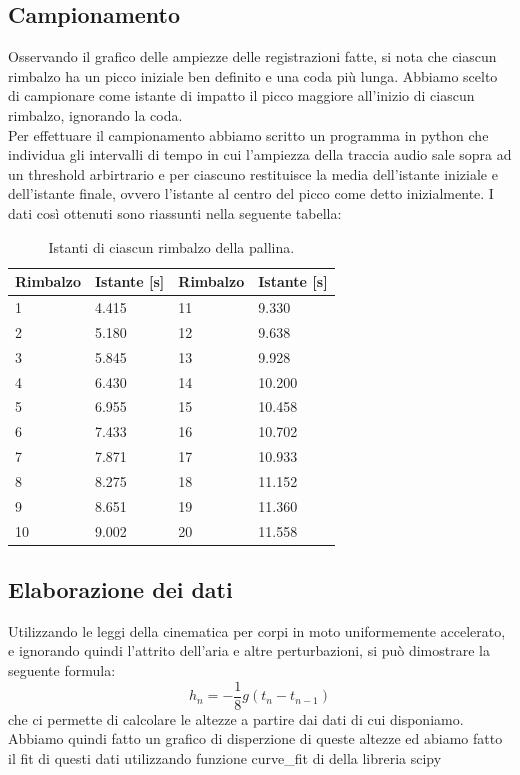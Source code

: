 \documentclass[a4paper]{article}
\begin{document}
    \subsection{Campionamento}
    Osservando il grafico delle ampiezze delle registrazioni fatte, si nota che ciascun rimbalzo
    ha un picco iniziale ben definito e una coda più lunga. 
    Abbiamo scelto di campionare come istante di impatto il picco maggiore all'inizio di ciascun rimbalzo,
    ignorando la coda.\\
    Per effettuare il campionamento abbiamo scritto un programma in python che individua
    gli intervalli di tempo in cui l'ampiezza della traccia audio sale sopra ad un threshold
    arbirtrario e per ciascuno restituisce la media dell'istante iniziale e dell'istante finale,
    ovvero l'istante al centro del picco come detto inizialmente.
    I dati così ottenuti sono riassunti nella seguente tabella:\\
    \begin{table}[H]
        \centering
        \begin{tabular}{ll|ll}
            Rimbalzo & Istante [\si{s}] & Rimbalzo & Istante [\si{s}]\\
            \hline
            \hline
            1&4.415&11&9.330\\
            2&5.180&12&9.638\\
            3&5.845&13&9.928\\
            4&6.430&14&10.200\\
            5&6.955&15&10.458\\
            6&7.433&16&10.702\\
            7&7.871&17&10.933\\
            8&8.275&18&11.152\\
            9&8.651&19&11.360\\
            10&9.002&20&11.558
        \end{tabular}
        \caption{Istanti di ciascun rimbalzo della pallina.}
        \label{tab:rimbalzi}
    \end{table}
    \subsection{Elaborazione dei dati}
    Utilizzando le leggi della cinematica per corpi in moto uniformemente accelerato,
    e ignorando quindi l'attrito dell'aria e altre perturbazioni, si può dimostrare la
    seguente formula:
    \begin{equation}
        \label{eq:altezza 2}
        h_n=-\frac{1}{8}g\left( t_n-t_{n-1} \right) 
    \end{equation}
    che ci permette di calcolare le altezze a partire dai dati di cui disponiamo.\\
    Abbiamo quindi fatto un grafico di disperzione di queste altezze ed abiamo fatto il
    fit di questi dati utilizzando funzione curve\_fit di della libreria scipy
\end{document}
